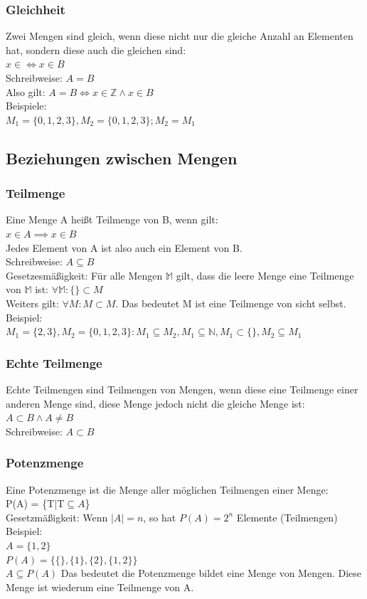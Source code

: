 \documentclass{article}
\newcommand{\N}{\mathbb{N}}
\newcommand{\Z}{\mathbb{Z}}
\newcommand{\M}{\mathbb{M}}
\begin{document}
	\subsubsection{Gleichheit}
	Zwei Mengen sind gleich, wenn diese nicht nur die gleiche Anzahl an Elementen hat, sondern diese auch die gleichen sind: \\
	$x\in \iff x \in B$ \\
	Schreibweise: $A = B$ \\
	Also gilt: $A = B \iff x \in \Z \land x \in B$\\
	Beispiele: \\
	$M_1 = \{0, 1, 2, 3\}, M_2 = \{0, 1, 2, 3\}; M_2 = M_1$
	\subsection{Beziehungen zwischen Mengen}
	\subsubsection{Teilmenge}
	Eine Menge A heißt Teilmenge von B, wenn gilt: \\
	$x\in A \implies x \in B$ \\
	Jedes Element von A ist also auch ein Element von B. \\
	Schreibweise: $A \subseteq B$\\
	Gesetzesmäßigkeit: Für alle Mengen $\M$ gilt, dass die leere Menge eine Teilmenge von $\M$ ist: $\forall \M:\{\}\subset M$ \\
	Weiters gilt: $\forall M:M\subset M$. Das bedeutet M ist eine Teilmenge von sicht selbst. \\
	Beispiel: \\
	$M_1 = \{2,3\}, M_2 = \{0, 1, 2, 3\}: M_1 \subseteq M_2, M_1 \subseteq \N, M_1 \subset \{\}, M_2 \subseteq M_1$
	\subsubsection{Echte Teilmenge}
	Echte Teilmengen sind Teilmengen von Mengen, wenn diese eine Teilmenge einer anderen Menge sind, diese Menge jedoch nicht die gleiche Menge ist: $A \subset B \land A \neq B$ \\
	Schreibweise: $A \subset B$
	\subsubsection{Potenzmenge}
	Eine Potenzmenge ist die Menge aller möglichen Teilmengen einer Menge: \\
	P(A) = \{T|T$\subseteq A$\} \\
	Gesetzmäßigkeit: Wenn $|A| = n$, so hat $P(A) = 2^n$ Elemente (Teilmengen) \\
	Beispiel: \\
	$A = \{1, 2\}$\\
	$P(A) = \{\{\}, \{1\}, \{2\}, \{1, 2\}\}$\\
	$A \subseteq P(A)$
	Das bedeutet die Potenzmenge bildet eine Menge von Mengen. Diese Menge ist wiederum eine Teilmenge von A.
\end{document}
